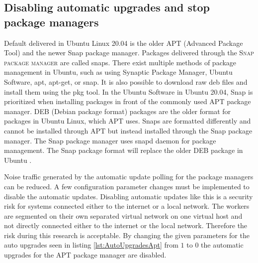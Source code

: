 \subsection{Disabling automatic upgrades and stop package managers}
\label{ss:DisableSnapAPT}
Default delivered in Ubuntu Linux 20.04 is the older APT (Advanced Package Tool) and the newer Snap package manager. Packages delivered through the \textsc{Snap package manager} are called snaps.
There exist multiple methods of package management in Ubuntu, such as using Synaptic Package Manager, Ubuntu Software, apt, apt-get, or snap. It is also possible to download raw deb files and install them using the pkg tool. In the Ubuntu Software in Ubuntu 20.04, Snap is prioritized when installing packages in front of the commonly used APT package manager. DEB (Debian package format) packages are the older format for packages in Ubuntu Linux, which APT uses. Snaps are formatted differently and cannot be installed through APT but instead installed through the Snap package manager. The Snap package manager uses snapd daemon for package management. The Snap package format will replace the older DEB package in Ubuntu \autocite{petersen2020ubuntu}.

Noise traffic generated by the automatic update polling for the package managers can be reduced. A few configuration parameter changes must be implemented to disable the automatic updates.
Disabling automatic updates like this is a security risk for systems connected either to the internet or a local network. The workers are segmented on their own separated virtual network on one virtual host and not directly connected either to the internet or the local network. Therefore the risk during this research is acceptable.
By changing the given parameters for the auto upgrades seen in listing \ref{lst:AutoUpgradesApt} from $1$ to $0$ the automatic upgrades for the APT package manager are disabled.




